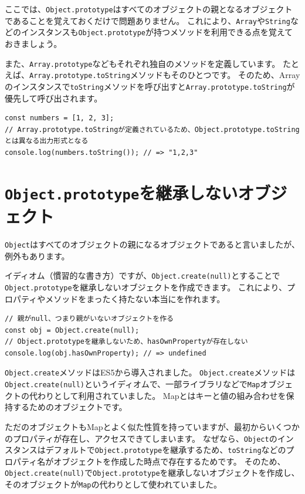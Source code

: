 ここでは、\texttt{Object.prototype}はすべてのオブジェクトの親となるオブジェクトであることを覚えておくだけで問題ありません。
これにより、\texttt{Array}や\texttt{String}などのインスタンスも\texttt{Object.prototype}が持つメソッドを利用できる点を覚えておきましょう。

また、\texttt{Array.prototype}などもそれぞれ独自のメソッドを定義しています。
たとえば、\texttt{Array.prototype.toString}メソッドもそのひとつです。
そのため、Arrayのインスタンスで\texttt{toString}メソッドを呼び出すと\texttt{Array.prototype.toString}が優先して呼び出されます。

\begin{lstlisting}
const numbers = [1, 2, 3];
// Array.prototype.toStringが定義されているため、Object.prototype.toStringとは異なる出力形式となる
console.log(numbers.toString()); // => "1,2,3"
\end{lstlisting}

\hypertarget{not-inherit-object}{%
\section{\texttt{Object.prototype}を継承しないオブジェクト}\label{not-inherit-object}}

\texttt{Object}はすべてのオブジェクトの親になるオブジェクトであると言いましたが、例外もあります。

イディオム（慣習的な書き方）ですが、\texttt{Object.create(null)}とすることで\texttt{Object.prototype}を継承しないオブジェクトを作成できます。
これにより、プロパティやメソッドをまったく持たない本当に\textbf{}を作れます。

\begin{lstlisting}
// 親がnull、つまり親がいないオブジェクトを作る
const obj = Object.create(null);
// Object.prototypeを継承しないため、hasOwnPropertyが存在しない
console.log(obj.hasOwnProperty); // => undefined
\end{lstlisting}

\texttt{Object.create}メソッドはES5から導入されました。
\texttt{Object.create}メソッドは\texttt{Object.create(null)}というイディオムで、一部ライブラリなどで\texttt{Map}オブジェクトの代わりとして利用されていました。
Mapとはキーと値の組み合わせを保持するためのオブジェクトです。

ただのオブジェクトもMapとよく似た性質を持っていますが、最初からいくつかのプロパティが存在し、アクセスできてしまいます。
なぜなら、\texttt{Object}のインスタンスはデフォルトで\texttt{Object.prototype}を継承するため、\texttt{toString}などのプロパティ名がオブジェクトを作成した時点で存在するためです。
そのため、\texttt{Object.create(null)}で\texttt{Object.prototype}を継承しないオブジェクトを作成し、そのオブジェクトが\texttt{Map}の代わりとして使われていました。

